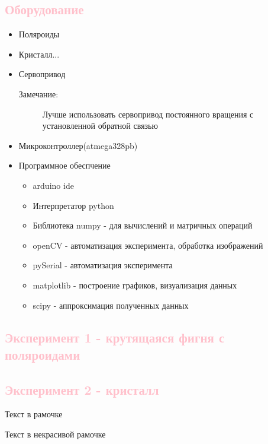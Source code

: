\documentclass[14pt, singlecolumn, citestyle=authoryear]{elegantbook}
\begin{document}
\subsection*{\textcolor{pink}{Оборудование}}
\begin{itemize}
    \item Поляроиды
    \item Кристалл...
    \item Сервопривод
    \begin{description}
     \item[Замечание:] Лучше использовать сервопривод постоянного вращения с установленной обратной связью
     \end{description}
    \item Микроконтроллер(atmega328pb)
    \item Программное обеспчение
    \begin{itemize}
        \item arduino ide
        \item Интерпретатор python
        \item Библиотека numpy - для вычислений и матричных операций
        \item openCV - автоматизация эксперимента, обработка изображений
        \item pySerial - автоматизация эксперимента
        \item matplotlib - построение графиков, визуализация данных
        \item scipy - аппроксимация полученных данных
    \end{itemize}
\end{itemize}

\subsection*{\textcolor{pink}{Эксперимент 1 - крутящаяся фигня с поляроидами}}
\subsection*{\textcolor{pink}{Эксперимент 2 - кристалл}}

\begin{tcolorbox}[enhanced,attach boxed title to top center={yshift=-3mm,yshifttext=-1mm},colback=cyan!5!white,colframe=cyan!75!black,colbacktitle=cyan!80!black,title =  Можем использовать вот такую красивую рамочку,fonttitle=\bfseries, boxed title style={size=small,colframe=cyan!75!black} ]
    Текст в рамочке
\end{tcolorbox}


\begin{tcolorbox}[enhanced,frame style image=blueshade.png,
  opacityback=0.75,opacitybacktitle=0.25,
  colback=blue!5!white,colframe=blue!75!black,
  title={\bf \centering И вот такую не очень красивую(как по мне) рамочку}]
    Текст в некрасивой рамочке
\end{tcolorbox}

%
\end{document}
